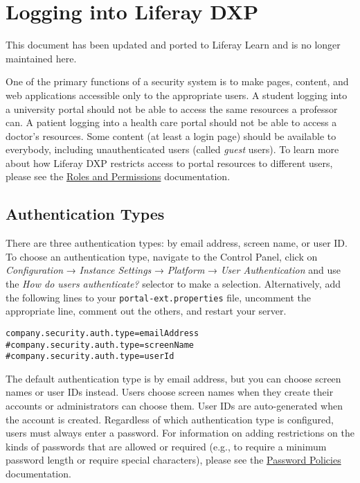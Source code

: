 \chapter{Logging into Liferay DXP}\label{logging-into-liferay-dxp}

{This document has been updated and ported to Liferay Learn and is no
longer maintained here.}

One of the primary functions of a security system is to make pages,
content, and web applications accessible only to the appropriate users.
A student logging into a university portal should not be able to access
the same resources a professor can. A patient logging into a health care
portal should not be able to access a doctor's resources. Some content
(at least a login page) should be available to everybody, including
unauthenticated users (called \emph{guest} users). To learn more about
how Liferay DXP restricts access to portal resources to different users,
please see the
\href{/docs/7-2/user/-/knowledge_base/u/roles-and-permissions}{Roles and
Permissions} documentation.

\section{Authentication Types}\label{authentication-types}

There are three authentication types: by email address, screen name, or
user ID. To choose an authentication type, navigate to the Control
Panel, click on \emph{Configuration} → \emph{Instance Settings} →
\emph{Platform} → \emph{User Authentication} and use the \emph{How do
users authenticate?} selector to make a selection. Alternatively, add
the following lines to your \texttt{portal-ext.properties} file,
uncomment the appropriate line, comment out the others, and restart your
server.

\begin{verbatim}
company.security.auth.type=emailAddress
#company.security.auth.type=screenName
#company.security.auth.type=userId
\end{verbatim}

The default authentication type is by email address, but you can choose
screen names or user IDs instead. Users choose screen names when they
create their accounts or administrators can choose them. User IDs are
auto-generated when the account is created. Regardless of which
authentication type is configured, users must always enter a password.
For information on adding restrictions on the kinds of passwords that
are allowed or required (e.g., to require a minimum password length or
require special characters), please see the
\href{/docs/7-2/user/-/knowledge_base/u/password-policies}{Password
Policies} documentation.

